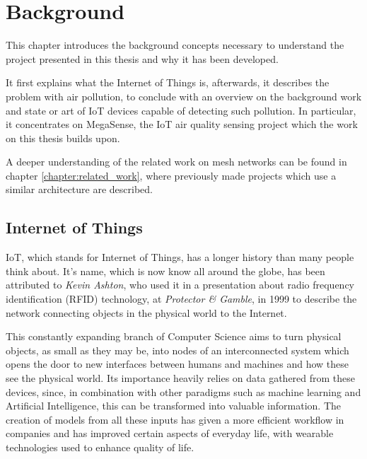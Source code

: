 
\chapter{Background}\label{chap:background}

	This chapter introduces the background concepts necessary to understand the project presented in this thesis and why it has been developed.
	
	It first explains what the Internet of Things is, afterwards, it describes the problem with air pollution, to conclude with an overview on the background work and state or art of IoT devices capable of detecting such pollution.
	In particular, it concentrates on MegaSense, the IoT air quality sensing project which the work on this thesis builds upon.

	A deeper understanding of the related work on mesh networks can be found in chapter \ref{chapter:related_work}, where previously made projects which use a similar architecture are described.

\section{Internet of Things}

	IoT, which stands for Internet of Things, has a longer history than many people think about.
	It's name, which is now know all around the globe, has been attributed to \textit{Kevin Ashton}, who used it in a presentation about radio frequency identification (RFID) technology, at \textit{Protector \& Gamble}, in 1999 \cite{iot_definition} to describe the network connecting objects in the physical world to the Internet.
	
	This constantly expanding branch of Computer Science aims to turn physical objects, as small as they may be, into nodes of an interconnected system which opens the door to new interfaces between humans and machines and how these see the physical world.
	Its importance heavily relies on data gathered from these devices, since, in combination with other paradigms such as machine learning and Artificial Intelligence, this can be transformed into valuable information.
	The creation of models from all these inputs has given a more efficient workflow in companies and has improved certain aspects of everyday life, with wearable technologies used to enhance quality of life.
	
